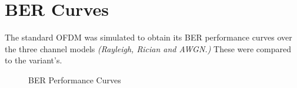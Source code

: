 \section{BER Curves}
The standard \gls{OFDM} was simulated to obtain its \gls{BER} performance curves over the three channel models \emph{(Rayleigh, Rician and AWGN.)} These were compared to the variant's.

\begin{figure}[!h]
	\centerline{}
	\caption{BER Performance Curves}
	\label{res:fig:berCurves}
\end{figure}

\pagebreak
